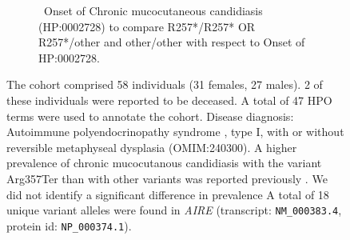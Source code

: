 \begin{figure}[htbp]
\vspace{2em}

\begin{subfigure}[b]{0.95\textwidth}
\captionsetup{justification=raggedright,singlelinecheck=false}
\caption{ Onset of Chronic mucocutaneous candidiasis (HP:0002728) to compare R257*/R257* OR R257*/other and other/other with respect to Onset of HP:0002728. }
\end{subfigure}

\vspace{2em}

\caption{ The cohort comprised 58 individuals (31 females, 27 males). 2 of these individuals were reported to be deceased. A total of 47 HPO terms were used to annotate the cohort. Disease diagnosis: Autoimmune polyendocrinopathy syndrome , type I, with or without reversible metaphyseal dysplasia (OMIM:240300). A
 higher prevalence of chronic mucocutanous candidiasis with the variant Arg357Ter than with other variants was reported previously \cite{PMID_12050215}. We did not identify a significant difference in prevalence A total of 18 unique variant alleles were found in \textit{AIRE} (transcript: \texttt{NM\_000383.4}, protein id: \texttt{NP\_000374.1}).}
\end{figure}
